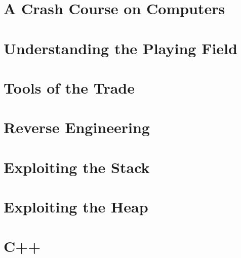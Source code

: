 \documentclass{article}
\author{Devin Neal}
\begin{document}
\tableofcontents
\newpage

\section{A Crash Course on Computers}


\section{Understanding the Playing Field}


\section{Tools of the Trade}


\section{Reverse Engineering}

\section{Exploiting the Stack}


\section{Exploiting the Heap}

\section{C++}
\end{document}
